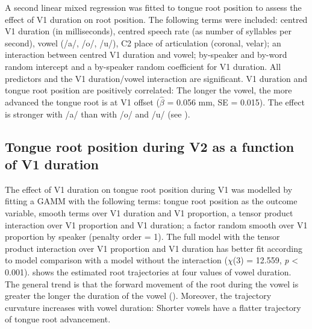 \documentclass[12pt,]{article}
\begin{document}
A second linear mixed regression was fitted to tongue root position to
assess the effect of V1 duration on root position. The following terms
were included: centred V1 duration (in milliseconds), centred speech
rate (as number of syllables per second), vowel (/a/, /o/, /u/), C2
place of articulation (coronal, velar); an interaction between centred
V1 duration and vowel; by-speaker and by-word random intercept and a
by-speaker random coefficient for V1 duration. All predictors and the V1
duration/vowel interaction are significant. V1 duration and tongue root
position are positively correlated: The longer the vowel, the more
advanced the tongue root is at V1 offset (\(\hat{\beta}\) = 0.056 mm, SE
= 0.015). The effect is stronger with /a/ than with /o/ and /u/ (see
).

\hypertarget{tongue-root-position-during-v2-as-a-function-of-v1-duration}{%
\subsection{Tongue root position during V2 as a function of V1
duration}\label{tongue-root-position-during-v2-as-a-function-of-v1-duration}}

The effect of V1 duration on tongue root position during V1 was modelled
by fitting a GAMM with the following terms: tongue root position as the
outcome variable, smooth terms over V1 duration and V1 proportion, a
tensor product interaction over V1 proportion and V1 duration; a factor
random smooth over V1 proportion by speaker (penalty order = 1). The
full model with the tensor product interaction over V1 proportion and V1
duration has better fit according to model comparison with a model
without the interaction (\(\chi\)(3) = 12.559, \emph{p} \textless{}
0.001).  shows the estimated root trajectories at
four values of vowel duration. The general trend is that the forward
movement of the root during the vowel is greater the longer the duration
of the vowel (). Moreover, the trajectory
curvature increases with vowel duration: Shorter vowels have a flatter
trajectory of tongue root advancement.
\end{document}
